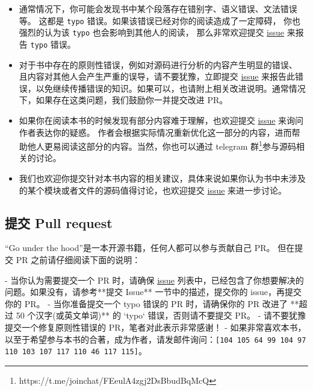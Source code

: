 \begin{itemize}
    \item 通常情况下，你可能会发现书中某个段落存在错别字、语义错误、文法错误等。
    这都是 \texttt{typo} 错误。如果该错误已经对你的阅读造成了一定障碍，
    你也强烈的认为该 \texttt{typo} 也会影响到其他人的阅读，
    那么非常欢迎提交 \href{https://github.com/changkun/go-under-the-hood/issues}{issue} 来报告 \texttt{typo} 错误。
    \item 对于书中存在的原则性错误，例如对源码进行分析的内容产生明显的错误、
    且内容对其他人会产生严重的误导，请不要犹豫，立即提交 \href{https://github.com/changkun/go-under-the-hood/issues}{issue} 来报告此错误，以免继续传播错误的知识。如果可以，也请附上相关改进说明。通常情况下，如果存在这类问题，我们鼓励你一并提交改进 PR。
    \item 如果你在阅读本书的时候发现有部分内容难于理解，也欢迎提交 \href{https://github.com/changkun/go-under-the-hood/issues}{issue} 来询问作者表达你的疑惑。
    作者会根据实际情况重新优化这一部分的内容，进而帮助他人更易阅读这部分的内容。当然，你也可以通过 telegram 群\footnote{https://t.me/joinchat/FEeulA4zgj2DsBbudBqMcQ}参与源码相关的讨论。
    \item 我们也欢迎你提交针对本书内容的相关建议，具体来说如果你认为书中未涉及的某个模块或者文件的源码值得讨论，也欢迎提交 \href{https://github.com/changkun/go-under-the-hood/issues}{issue} 来进一步讨论。
\end{itemize}

\subsection*{提交 Pull request}

``Go under the hood''是一本开源书籍，任何人都可以参与贡献自己 PR。
但在提交 PR 之前请仔细阅读下面的说明：

- 当你认为需要提交一个 PR 时，请确保 \href{https://github.com/changkun/go-under-the-hood/issues}{issue} 列表中，已经包含了你想要解决的问题。如果没有，请参考**提交 Issue** 一节中的描述，提交你的 issue，再提交你的 PR。
- 当你准备提交一个 typo 错误的 PR 时，请确保你的 PR 改进了 **超过 50 个汉字(或英文单词)** 的 `typo` 错误，否则请不要提交 PR。
- 请不要犹豫提交一个修复原则性错误的 PR，笔者对此表示非常感谢！
- 如果非常喜欢本书，以至于希望参与本书的合著，成为作者，请发邮件询问：\texttt{[104 105 64 99 104 97 110 103 107 117 110 46 117 115]}。